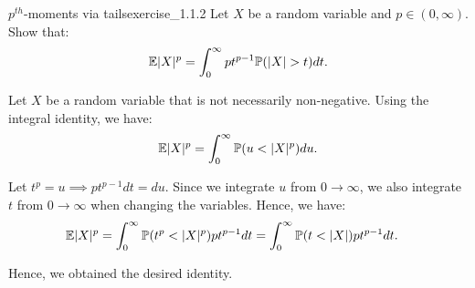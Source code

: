 \begin{exercise}{$p^{th}$-moments via tails}{exercise_1.1.2}
    Let $X$ be a random variable and $p\in(0,\infty)$. Show that:
    \begin{align}
        \mathbb{E}|X|^p = \int_0^\infty pt^{p-1}\mathbb{P}(|X| > t)dt.
    \end{align}
\end{exercise}

\begin{solution*}
    Let $X$ be a random variable that is not necessarily non-negative. Using the integral identity, we have:
    \begin{align*}
        \E|X|^p = \int_0^\infty \Pm(u<|X|^p)du.
    \end{align*}

    \noindent Let $t^p = u \implies p t^{p-1}dt = du$. Since we integrate $u$ from $0\to\infty$, we also integrate $t$ from $0\to\infty$ when changing the variables. Hence, we have:
    \begin{align*}
        \mathbb{E}|X|^p &= \int_0^\infty \mathbb{P}(t^p < |X|^p)pt^{p-1}dt = \int_0^\infty \mathbb{P}(t < |X|)pt^{p-1}dt.
    \end{align*}

    \noindent Hence, we obtained the desired identity.
\end{solution*}
